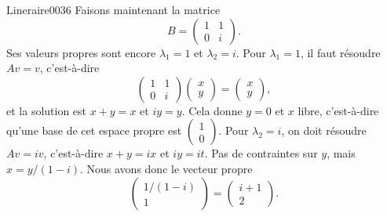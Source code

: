 \begin{corrige}{Lineraire0036}
	Faisons maintenant la matrice
	\begin{equation}
		B=\begin{pmatrix}
			1	&	1	\\ 
			0	&	i	
		\end{pmatrix}.
	\end{equation}
	Ses valeurs propres sont encore $\lambda_1=1$ et $\lambda_2=i$. Pour $\lambda_1=1$, il faut résoudre $Av=v$, c'est-à-dire
	\begin{equation}
		\begin{pmatrix}
			1	&	1	\\ 
			0	&	i	
		\end{pmatrix}\begin{pmatrix}
			x	\\ 
			y	
		\end{pmatrix}=\begin{pmatrix}
			x	\\ 
			y	
		\end{pmatrix},
	\end{equation}
	et la solution est $x+y=x$ et $iy=y$. Cela donne $y=0$ et $x$ libre, c'est-à-dire qu'une base de cet espace propre est $\begin{pmatrix}
		1	\\ 
		0	
	\end{pmatrix}$. Pour $\lambda_2=i$, on doit résoudre $Av=iv$, c'est-à-dire $x+y=ix$ et $iy=it$. Pas de contraintes sur $y$, mais $x=y/(1-i)$. Nous avons donc le vecteur propre
	\begin{equation}
		\begin{pmatrix}
			1/(1-i)	\\ 
			1	
		\end{pmatrix}=\begin{pmatrix}
			i+1	\\ 
			2	
		\end{pmatrix}.
	\end{equation}

\end{corrige}
